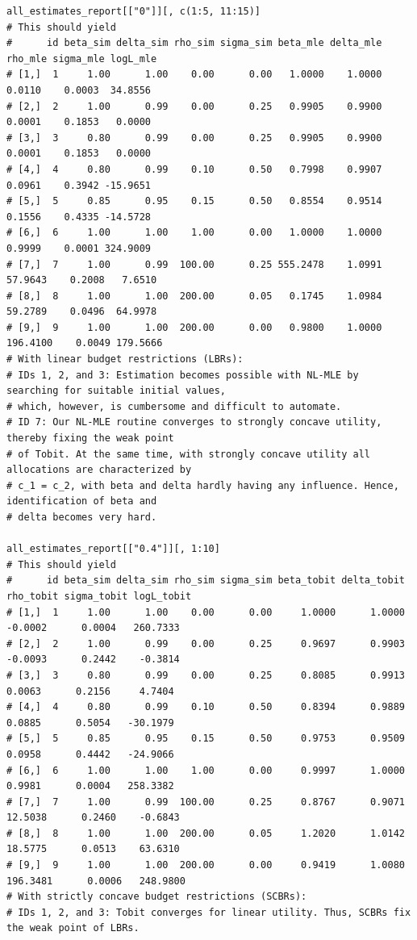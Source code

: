 \documentclass[11pt, a4paper, oneside]{article}
\theoremstyle{Plain}
\theoremstyle{Definition}
\theoremstyle{Remark}
\begin{document}
\begin{appendix}
\begin{lstlisting}
all_estimates_report[["0"]][, c(1:5, 11:15)]
# This should yield
#      id beta_sim delta_sim rho_sim sigma_sim beta_mle delta_mle  rho_mle sigma_mle logL_mle
# [1,]  1     1.00      1.00    0.00      0.00   1.0000    1.0000   0.0110    0.0003  34.8556
# [2,]  2     1.00      0.99    0.00      0.25   0.9905    0.9900   0.0001    0.1853   0.0000
# [3,]  3     0.80      0.99    0.00      0.25   0.9905    0.9900   0.0001    0.1853   0.0000
# [4,]  4     0.80      0.99    0.10      0.50   0.7998    0.9907   0.0961    0.3942 -15.9651
# [5,]  5     0.85      0.95    0.15      0.50   0.8554    0.9514   0.1556    0.4335 -14.5728
# [6,]  6     1.00      1.00    1.00      0.00   1.0000    1.0000   0.9999    0.0001 324.9009
# [7,]  7     1.00      0.99  100.00      0.25 555.2478    1.0991  57.9643    0.2008   7.6510
# [8,]  8     1.00      1.00  200.00      0.05   0.1745    1.0984  59.2789    0.0496  64.9978
# [9,]  9     1.00      1.00  200.00      0.00   0.9800    1.0000 196.4100    0.0049 179.5666
# With linear budget restrictions (LBRs):
# IDs 1, 2, and 3: Estimation becomes possible with NL-MLE by searching for suitable initial values,
# which, however, is cumbersome and difficult to automate.
# ID 7: Our NL-MLE routine converges to strongly concave utility, thereby fixing the weak point
# of Tobit. At the same time, with strongly concave utility all allocations are characterized by
# c_1 = c_2, with beta and delta hardly having any influence. Hence, identification of beta and
# delta becomes very hard.

all_estimates_report[["0.4"]][, 1:10]
# This should yield
#      id beta_sim delta_sim rho_sim sigma_sim beta_tobit delta_tobit rho_tobit sigma_tobit logL_tobit
# [1,]  1     1.00      1.00    0.00      0.00     1.0000      1.0000   -0.0002      0.0004   260.7333
# [2,]  2     1.00      0.99    0.00      0.25     0.9697      0.9903   -0.0093      0.2442    -0.3814
# [3,]  3     0.80      0.99    0.00      0.25     0.8085      0.9913    0.0063      0.2156     4.7404
# [4,]  4     0.80      0.99    0.10      0.50     0.8394      0.9889    0.0885      0.5054   -30.1979
# [5,]  5     0.85      0.95    0.15      0.50     0.9753      0.9509    0.0958      0.4442   -24.9066
# [6,]  6     1.00      1.00    1.00      0.00     0.9997      1.0000    0.9981      0.0004   258.3382
# [7,]  7     1.00      0.99  100.00      0.25     0.8767      0.9071   12.5038      0.2460    -0.6843
# [8,]  8     1.00      1.00  200.00      0.05     1.2020      1.0142   18.5775      0.0513    63.6310
# [9,]  9     1.00      1.00  200.00      0.00     0.9419      1.0080  196.3481      0.0006   248.9800
# With strictly concave budget restrictions (SCBRs):
# IDs 1, 2, and 3: Tobit converges for linear utility. Thus, SCBRs fix the weak point of LBRs.


\end{lstlisting}
\end{appendix}
\end{document}
